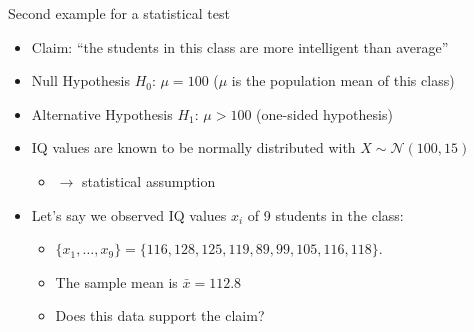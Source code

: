 \begin{frame}[c]{Second example for a statistical test}

\begin{itemize}
	\item Claim: \alert{``the students in this class are more intelligent
		than average''}
	\bigskip
	\pause
	\item \alert{Null Hypothesis $H_0$}: $\mu=100$ ($\mu$ is the population
	mean of this class)
	\item \alert{Alternative Hypothesis $H_1$}: $\mu>100$ (\alert{one-sided} hypothesis)
	\bigskip
	\pause
	\item IQ values are known to be normally distributed with $X \sim
	\mathcal{N}(100,15)$
	\begin{itemize}
	\item$\to$ statistical assumption
	\end{itemize}
	
	\bigskip
	\pause
	
	\item Let's say we observed IQ values $x_i$ of 9 students in the class:
	\begin{itemize}
	\item $\{x_1,\dots,x_9\} = \{116, 128, 125, 119, 89, 99, 105, 116, 118\}$.
	\item The \alert{sample mean} is $\bar{x}=112.8$
	\item Does this data support the claim?
	\end{itemize}	

\end{itemize}	

\end{frame}
